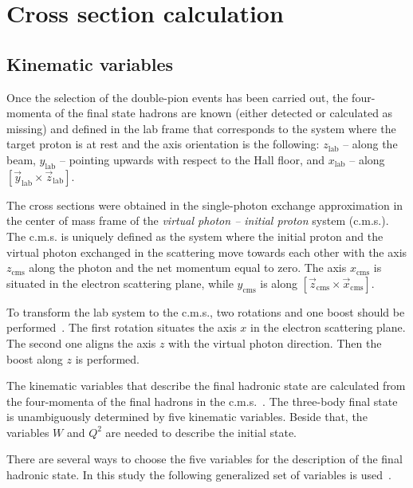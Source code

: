\documentclass[prc,twocolumn,superscriptaddress,showpacs,amssymb,amsmath,amsfonts,aps,nofootinbib]{revtex4-1}
\begin{document}
\section{Cross section calculation}

\subsection{Kinematic variables}
\label{sec_kin_var}

Once the selection of the double-pion events has been carried out, the four-momenta of the final state hadrons are known (either detected or calculated as missing) and defined in the lab frame that corresponds to the system where the target proton is at rest and the axis orientation is the following: $z_{\text{lab}}$ -- along the beam, $y_{\text{lab}}$ -- pointing upwards with respect to the Hall floor, and $x_{\text{lab}}$ -- along $[\vec y_{\text{lab}} \times \vec z_{\text{lab}}]$.


The cross sections were obtained in the single-photon exchange approximation in the center of mass frame of the {\em virtual photon -- initial proton} system (c.m.s.).   
The c.m.s. is uniquely defined as the system where the initial proton and the virtual photon exchanged in the scattering move towards each other with the axis $z_{\text{cms}}$ along the photon and the net momentum equal to zero. The axis $x_{\text{cms}}$ is situated in the electron scattering plane, while $y_{\text{cms}}$ is along $[\vec z_{\text{cms}} \times \vec x_{\text{cms}}]$.

To transform the lab system to the c.m.s., two rotations and one
boost should be performed~\cite{Fed_an_note:2017}.
The first rotation situates the axis $x$ in the electron scattering plane.
The second one aligns the axis $z$ with the virtual photon direction. 
Then the boost along $z$ is performed. 


The kinematic variables that describe the final hadronic state are calculated from the four-momenta of the final hadrons in the c.m.s.~\cite{Isupov:2017lnd,Fedotov:2008aa}.
The three-body final state is 
unambiguously determined by five kinematic
variables. 
Beside that, the variables $W$ and $Q^{2}$ are needed to describe the initial state.
 
There are several ways to choose the five variables for the description of the final hadronic state. In this study the following generalized set of
variables is used~\cite{Fed_an_note:2017,Byckling:1971vca,Isupov:2017lnd,Fedotov:2008aa,Mokeev:2015lda}.
\end{document}
